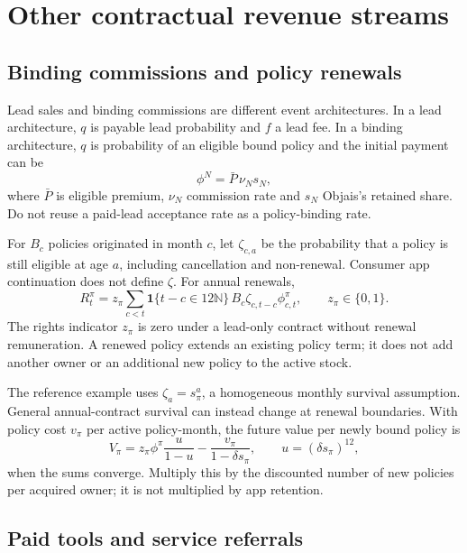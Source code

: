 \documentclass[11pt,a4paper]{article}
\begin{document}
\section{Other contractual revenue streams}

\subsection{Binding commissions and policy renewals}

Lead sales and binding commissions are different event architectures. In a lead architecture, $q$ is payable lead probability and $f$ a lead fee. In a binding architecture, $q$ is probability of an eligible bound policy and the initial payment can be
\begin{equation}
 \phi^{N}=\bar P\,\nu_N s_N,
\end{equation}
where $\bar P$ is eligible premium, $\nu_N$ commission rate and $s_N$ Objais's retained share. Do not reuse a paid-lead acceptance rate as a policy-binding rate.

For $B_c$ policies originated in month $c$, let $\zeta_{c,a}$ be the probability that a policy is still eligible at age $a$, including cancellation and non-renewal. Consumer app continuation does not define $\zeta$. For annual renewals,
\begin{equation}
 R_t^{\pi}=z_\pi\sum_{c<t}
  \mathbf1\{t-c\in12\mathbb N\}\,B_c\zeta_{c,t-c}\phi^{\pi}_{c,t},
 \qquad z_\pi\in\{0,1\}.
 \label{eq:renewal}
\end{equation}
The rights indicator $z_\pi$ is zero under a lead-only contract without renewal remuneration. A renewed policy extends an existing policy term; it does not add another owner or an additional new policy to the active stock.

The reference example uses $\zeta_a=s_\pi^a$, a homogeneous monthly survival assumption. General annual-contract survival can instead change at renewal boundaries. With policy cost $v_\pi$ per active policy-month, the future value per newly bound policy is
\begin{equation}
 V_\pi=z_\pi\phi^\pi\frac{u}{1-u}-\frac{v_\pi}{1-\delta s_\pi},
 \qquad u=(\delta s_\pi)^{12},
\end{equation}
when the sums converge. Multiply this by the discounted number of new policies per acquired owner; it is not multiplied by app retention.

\subsection{Paid tools and service referrals}
\end{document}
